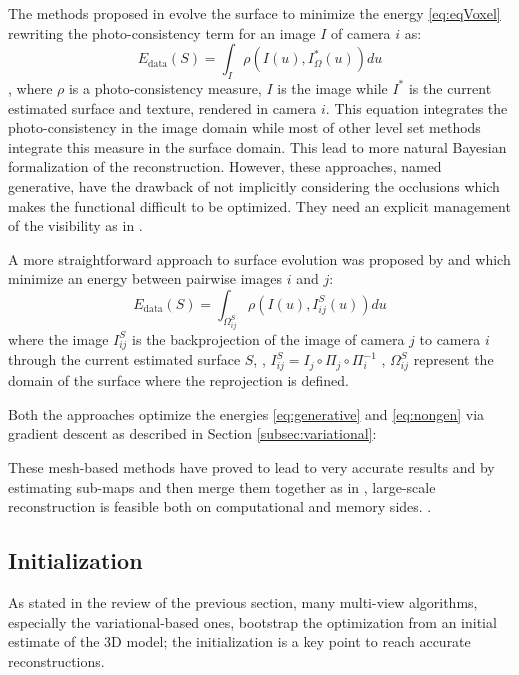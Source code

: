 The methods proposed in \cite{delaunoy_et_al_08,gargallo2007minimizing,delaunoy2011gradient} evolve the surface to minimize the energy \eqref{eq:eqVoxel} rewriting the photo-consistency term for an image $I$ of camera $i$ as:
\begin{equation}
\label{eq:generative}
  E_{\text{data}}(S) = \int_{\mathit{I}} \rho\left(I(\mathit{u}), I^*_{\Omega}(\mathit{u})\right) d\mathit{u}
\end{equation},
where $\rho$ is a photo-consistency measure, $I$ is the image while $I^*$ is the current estimated surface and texture, rendered in camera $i$.
This equation integrates the photo-consistency in the image domain while most of other level set methods integrate this measure in the surface domain. This lead to more natural Bayesian formalization of the reconstruction. 
However, these approaches, named generative, have the drawback of not implicitly considering the occlusions which makes the functional difficult to be optimized. They need an explicit management of the visibility as in \cite{delaunoy2011gradient}.

A more straightforward approach to surface evolution was proposed by \cite{hiep2009towards} and \cite{vu2011large} which minimize an energy between pairwise images $i$ and $j$:
\begin{equation}
\label{eq:nongen}
  E_{\text{data}}(S) = \int_{\Omega^{\mathit{S}}_{ij}} \rho\left(I(\mathit{u}), I^{\mathit{S}}_{ij}(\mathit{u})\right) d\mathit{u}
\end{equation}
where the image $I^{\mathit{S}}_{ij}$ is the backprojection of the image of camera $j$ to camera $i$ through the current estimated surface $\mathit{S}$, \ie, $I^{\mathit{S}}_{ij} = I_j \circ \Pi_j \circ \Pi_i^{-1}$ , $\Omega^{\mathit{S}}_{ij}$ represent the domain of the surface where the reprojection is defined.

Both the approaches optimize the energies \eqref{eq:generative} and \eqref{eq:nongen} via gradient descent as described in Section \ref{subsec:variational}:

These mesh-based methods have proved to lead to very accurate results and  by estimating  sub-maps and then merge them together as in \cite{vu2011large},  large-scale reconstruction is feasible both on computational and memory sides.
.

\subsection{Initialization}
As stated in the review of the previous section, many  multi-view algorithms, especially the variational-based ones, bootstrap the optimization from an initial estimate of the 3D model; the initialization is a key point to reach accurate reconstructions.

